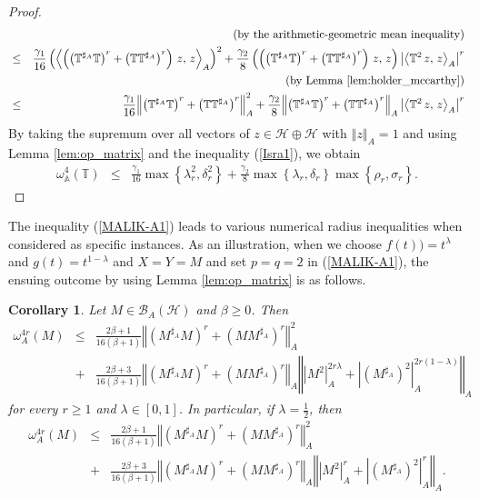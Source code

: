 \documentclass{article}
\newcommand{\bra}[1]{\left(#1\right)}
\newcommand{\seqA}[1]{{\left<#1\right>}_{A}}
\newcommand{\normA}[1]{{\left\Vert#1\right\Vert}_{A}}
\newcommand{\abs}[1]{\left\vert#1\right\vert}
\newcommand{\set}[1]{\left\{#1\right\}}
\newcommand{\hh}{\mathcal{H}\oplus\mathcal{H}}
\newcommand {\A}{\mathbb{A}}
\newcommand {\Ma}{M^{\sharp_{A}}}
\newcommand {\T}{\mathbb{T}}
\newcommand {\h}{\mathcal{H}}
\newcommand {\Ta}{\mathbb{T}^{\sharp_{A}}}
\renewcommand {\b}{\mathcal{B}}
\newtheorem{corollary}[theorem]{Corollary}
\begin{document}
\begin{proof}
\begin{eqnarray*}
   &&\bra{\mbox{by the arithmetic-geometric mean inequality}}\\
   &\leq& \frac{\gamma_1}{16}\bra{\seqA{\bra{\bra{\Ta\T}^{r}+\bra{\T\Ta}^{r}}\,z,\,z}}^2+\frac{\gamma_2}{8}
   \bra{\bra{\bra{\Ta\T}^{r}+\bra{\T\Ta}^{r}}\,z,\,z}
   \abs{\seqA{\T^2\,z,\,z}}^r\\
   &&\bra{\mbox{by Lemma \ref{lem:holder_mccarthy}}}\\
   &\leq&\frac{\gamma_1}{16}\normA{\bra{\Ta\T}^{r}+\bra{\T\Ta}^{r}}^2+\frac{\gamma_2}{8}\normA{\bra{\Ta\T}^{r}+\bra{\T\Ta}^{r}}\abs{\seqA{\T^2\,z,\,z}}^r
\end{eqnarray*}
By taking the supremum over all vectors of $z\in\hh$ with $\normA{z}=1$ and using Lemma \ref{lem:op_matrix} and the inequality (\ref{Isra1}), we obtain
\begin{eqnarray*}
  \omega_{\A}^4(\T) &\leq&\frac{\gamma_1}{16}\max\set{\lambda_r^2,\delta_r^2}
   +\frac{\gamma_2}{8}\max\set{\lambda_r,\delta_r}\max\set{\rho_r,\sigma_r}.
\end{eqnarray*}
\end{proof}
The inequality (\ref{MALIK-A1}) leads to various numerical radius inequalities when considered as specific instances. As an illustration, when we
choose $f(t))=t^{\lambda}$ and $g(t)=t^{1-\lambda}$ and $X=Y=M$ and set $p=q=2$ in (\ref{MALIK-A1}), the ensuing outcome by using Lemma \ref{lem:op_matrix} is as follows.
\begin{corollary} Let $M\in\b_A(\h)$ and $\beta\geq 0$. Then
\begin{eqnarray*}
  \omega_A^{4r}(M) &\leq&\frac{2\beta+1}{16(\beta+1)}\normA{\bra{\Ma M}^{r}+\bra{M\Ma}^{r}}^2\\
   &+& \frac{2\beta+3}{16(\beta+1)}\normA{\bra{\Ma M}^{r}+\bra{M\Ma}^{r}}
  \normA{|M^2|_{A}^{2r\lambda}+|(\Ma)^2|_{A}^{2r(1-\lambda)}}
\end{eqnarray*}
for every $r\geq 1$ and $\lambda\in [0,1]$. In particular, if $\lambda=\frac{1}{2}$, then
\begin{eqnarray*}
  \omega_A^{4r}(M) &\leq&\frac{2\beta+1}{16(\beta+1)}\normA{\bra{\Ma M}^{r}+\bra{M\Ma}^{r}}^2\\
   &+& \frac{2\beta+3}{16(\beta+1)}\normA{\bra{\Ma M}^{r}+\bra{M\Ma}^{r}}
  \normA{|M^2|_{A}^{r}+|(\Ma)^2|_{A}^{r}}.
\end{eqnarray*}
\end{corollary}
\end{document}
